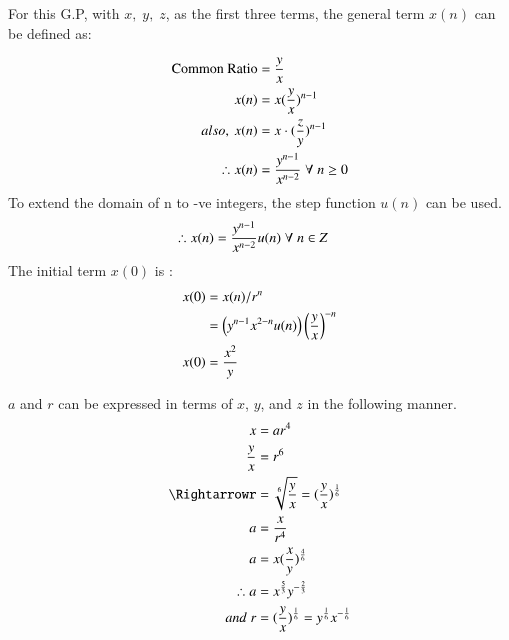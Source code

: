 \documentclass[journal,12pt,twocolumn]{IEEEtran}
\theoremstyle{remark}
\begin{document}
For this G.P, with $x,\;y,\;z$, as the first three terms, the general term $x(n)$ can be defined as:

\begin{align}
\notag \text{Common Ratio}&=\frac{y}{x} \\
x(n)&=x({\frac{y}{x}})^{n-1} \\
also,\: x(n)&=x\cdot (\frac{z}{y})^{n-1} \\
\notag \therefore x(n)&=\frac{y^{n-1}}{x^{n-2}}\; \forall\; n\geq0
\end{align}
To extend the domain of n to -ve integers, the step function $u(n)$ can be used.
\begin{align}
\notag    \therefore x(n) &= \frac{y^{n-1}}{x^{n-2}} u(n) \; \forall \;n\in Z
\end{align}
The initial term $x(0)$ is :
\begin{align}
    x(0)&=x(n)/r^n\\
\notag    &=\left(y^{n-1} x^{2-n} u(n)\right)\left(\frac{y}{x}\right)^{-n}\\
    x(0)&=\frac{x^2}{y}
\end{align}

$a$ and $r$ can be expressed in terms of $x$, $y$, and $z$ in the following manner.
\begin{align}
\notag      x&=ar^4 \\
\notag    \frac{y}{x}&=r^6 \\
\Rightarrowr&=\sqrt[6]{\frac{y}{x}}=(\frac{y}{x})^{\frac{1}{6}}\\
\notag    a&=\frac{x}{r^4}\\
\notag    a&=x(\frac{x}{y})^{\frac{4}{6}}\\
\therefore a&=x^{\frac{5}{3}}y^{-\frac{2}{3}} \\
and\; r&=(\frac{y}{x})^{\frac{1}{6}}= y^{\frac{1}{6}}x^{-\frac{1}{6}}
\end{align}
\end{document}

